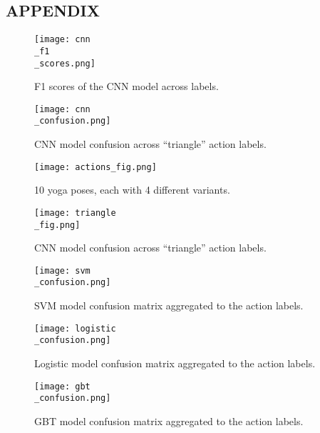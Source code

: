 \documentclass[
	a4paper, %
	10pt, %
	unnumberedsections, %
	twoside, %
]{t0004}
\begin{document}
\clearpage
\begin{appendices}

\section*{APPENDIX}

\begin{figure}[H]
	\texttt{[image: cnn\\\_f1\\\_scores.png]}
	\caption{F1 scores of the CNN model across labels.}
	\label{fig:f1cnn}
\end{figure}

\begin{figure}[H]
	\texttt{[image: cnn\\\_confusion.png]}
	\caption{CNN model confusion across ``triangle'' action labels.}
	\label{fig:f1cnn}
\end{figure}

\begin{figure*}
	\texttt{[image: actions\_fig.png]}
	\caption{10 yoga poses, each with 4 different variants.}
	\label{fig:actionsfig}
\end{figure*}

\begin{figure*}
	\texttt{[image: triangle\\\_fig.png]}
	\caption{CNN model confusion across ``triangle'' action labels.}
	\label{fig:trianglecnn}
\end{figure*}

\begin{figure*}
	\texttt{[image: svm\\\_confusion.png]}
	\caption{SVM model confusion matrix aggregated to the action labels.}
	\label{fig:svmconfusion}
\end{figure*}

\begin{figure*}
	\texttt{[image: logistic\\\_confusion.png]}
	\caption{Logistic model confusion matrix aggregated to the action labels.}
	\label{fig:logisticconfusion}
\end{figure*}

\begin{figure*}
	\texttt{[image: gbt\\\_confusion.png]}
	\caption{GBT model confusion matrix aggregated to the action labels.}
	\label{fig:gbtconfusion}
\end{figure*}

\end{appendices}
\end{document}
